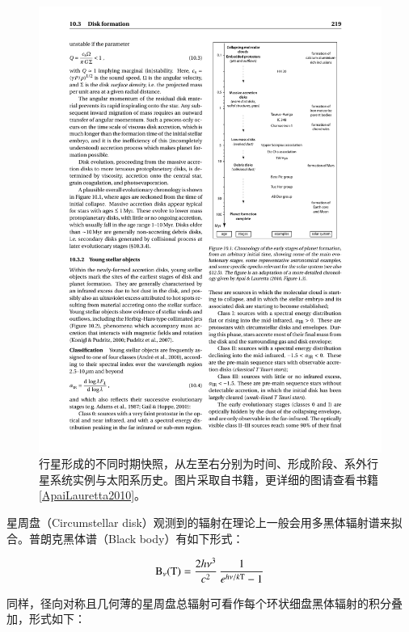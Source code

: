 \begin{figure}
\centering
\includegraphics[scale=3.0, angle=-90]{figures/chapter3/f1_pfdisc.pdf}
\caption[行星形成的不同时期快照，从左至右分别为时间、形成阶段、系外行星系统实例与太阳系历史，版权所有人 Perryman。]{行星形成的不同时期快照，从左至右分别为时间、形成阶段、系外行星系统实例与太阳系历史。图片采取自书籍，更详细的图请查看书籍\ref{ApaiLauretta2010}。}
\label{fig:pfdics}
\end{figure}



星周盘（Circumstellar disk）观测到的辐射在理论上一般会用多黑体辐射谱来拟合。普朗克黑体谱（Black body）有如下形式：

\begin{equation} \label{eq:blackbody}
\mathrm{B}_\nu (\mathrm{T}) = \frac{2h\nu^3}{c^2} \, \frac{1}{e^{h\nu / k\mathrm{T}}-1}
\end{equation} %


同样，径向对称且几何薄的星周盘总辐射可看作每个环状细盘黑体辐射的积分叠加，形式如下：

